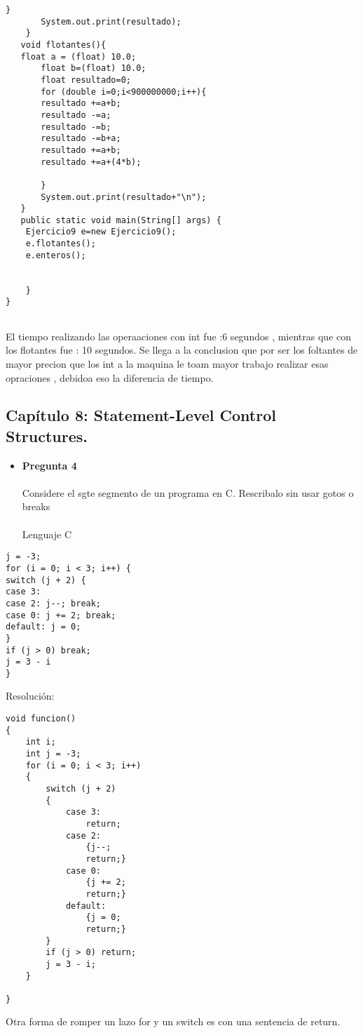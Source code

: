 \documentclass[12pt,oneside]{article}
\begin{document}
\begin{itemize}
\begin{lstlisting}[frame=single]
       }
       System.out.print(resultado);
    }
   void flotantes(){
   float a = (float) 10.0;
       float b=(float) 10.0;
       float resultado=0;
       for (double i=0;i<900000000;i++){
       resultado +=a+b;
       resultado -=a;
       resultado -=b;
       resultado -=b+a;
       resultado +=a+b;
       resultado +=a+(4*b);
       
       }
       System.out.print(resultado+"\n");
   }
   public static void main(String[] args) {
    Ejercicio9 e=new Ejercicio9();
    e.flotantes();
    e.enteros();
    
    
    }
}
 

\end{lstlisting}

El tiempo realizando las operaaciones con int fue :6 segundos ,   mientras que con los flotantes fue : 10 segundos.    Se llega a la conclusion que por ser los foltantes de mayor precion que los int a la maquina le toam mayor trabajo realizar esas opraciones , debidoa  eso la diferencia de tiempo. \\

\end{itemize}
\subsection{Capítulo 8: Statement-Level Control Structures.}
\begin{itemize}
\item {\bf Pregunta 4} \\\\
Considere el sgte segmento de un programa en C. Rescribalo sin usar gotos o breaks\\\\
Lenguaje C\\
\end{itemize}
\begin{lstlisting}[frame=single]  % Start your code-block
j = -3;
for (i = 0; i < 3; i++) {
switch (j + 2) {
case 3:
case 2: j--; break;
case 0: j += 2; break;
default: j = 0;
}
if (j > 0) break;
j = 3 - i
}
\end{lstlisting}
Resolución:
\begin{lstlisting}[frame=single] 
void funcion()
{
	int i;
	int j = -3;
	for (i = 0; i < 3; i++) 
	{
		switch (j + 2) 
		{
			case 3:
				return;
			case 2: 
				{j--; 
				return;}
			case 0:
				{j += 2; 
				return;}
			default:
				{j = 0;
				return;}
		}
		if (j > 0) return;
		j = 3 - i;
	}
	
}
\end{lstlisting}
Otra forma de romper un lazo for y un switch es con una sentencia de return.
\end{document}
